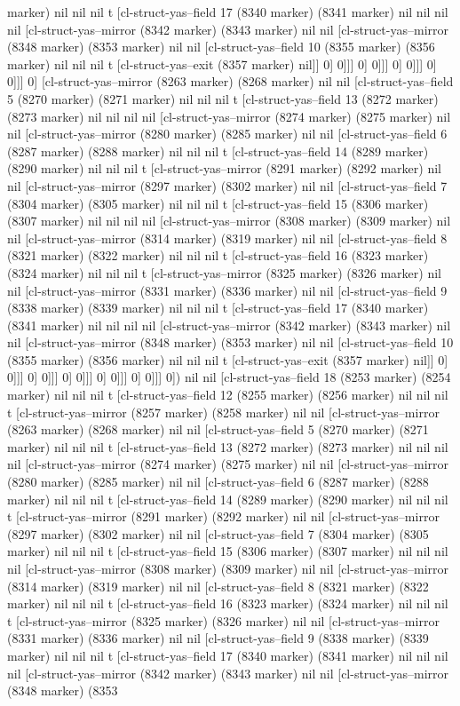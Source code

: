 {{marker) nil nil nil t [cl-struct-yas--field 17 (8340 marker) (8341 marker) nil nil nil nil [cl-struct-yas--mirror (8342 marker) (8343 marker) nil nil [cl-struct-yas--mirror (8348 marker) (8353 marker) nil nil [cl-struct-yas--field 10 (8355 marker) (8356 marker) nil nil nil t [cl-struct-yas--exit (8357 marker) nil]] 0] 0]]] 0] 0]]] 0] 0]]] 0] 0]]] 0] [cl-struct-yas--mirror (8263 marker) (8268 marker) nil nil [cl-struct-yas--field 5 (8270 marker) (8271 marker) nil nil nil t [cl-struct-yas--field 13 (8272 marker) (8273 marker) nil nil nil nil [cl-struct-yas--mirror (8274 marker) (8275 marker) nil nil [cl-struct-yas--mirror (8280 marker) (8285 marker) nil nil [cl-struct-yas--field 6 (8287 marker) (8288 marker) nil nil nil t [cl-struct-yas--field 14 (8289 marker) (8290 marker) nil nil nil t [cl-struct-yas--mirror (8291 marker) (8292 marker) nil nil [cl-struct-yas--mirror (8297 marker) (8302 marker) nil nil [cl-struct-yas--field 7 (8304 marker) (8305 marker) nil nil nil t [cl-struct-yas--field 15 (8306 marker) (8307 marker) nil nil nil nil [cl-struct-yas--mirror (8308 marker) (8309 marker) nil nil [cl-struct-yas--mirror (8314 marker) (8319 marker) nil nil [cl-struct-yas--field 8 (8321 marker) (8322 marker) nil nil nil t [cl-struct-yas--field 16 (8323 marker) (8324 marker) nil nil nil t [cl-struct-yas--mirror (8325 marker) (8326 marker) nil nil [cl-struct-yas--mirror (8331 marker) (8336 marker) nil nil [cl-struct-yas--field 9 (8338 marker) (8339 marker) nil nil nil t [cl-struct-yas--field 17 (8340 marker) (8341 marker) nil nil nil nil [cl-struct-yas--mirror (8342 marker) (8343 marker) nil nil [cl-struct-yas--mirror (8348 marker) (8353 marker) nil nil [cl-struct-yas--field 10 (8355 marker) (8356 marker) nil nil nil t [cl-struct-yas--exit (8357 marker) nil]] 0] 0]]] 0] 0]]] 0] 0]]] 0] 0]]] 0] 0]]] 0]) nil nil [cl-struct-yas--field 18 (8253 marker) (8254 marker) nil nil nil t [cl-struct-yas--field 12 (8255 marker) (8256 marker) nil nil nil t [cl-struct-yas--mirror (8257 marker) (8258 marker) nil nil [cl-struct-yas--mirror (8263 marker) (8268 marker) nil nil [cl-struct-yas--field 5 (8270 marker) (8271 marker) nil nil nil t [cl-struct-yas--field 13 (8272 marker) (8273 marker) nil nil nil nil [cl-struct-yas--mirror (8274 marker) (8275 marker) nil nil [cl-struct-yas--mirror (8280 marker) (8285 marker) nil nil [cl-struct-yas--field 6 (8287 marker) (8288 marker) nil nil nil t [cl-struct-yas--field 14 (8289 marker) (8290 marker) nil nil nil t [cl-struct-yas--mirror (8291 marker) (8292 marker) nil nil [cl-struct-yas--mirror (8297 marker) (8302 marker) nil nil [cl-struct-yas--field 7 (8304 marker) (8305 marker) nil nil nil t [cl-struct-yas--field 15 (8306 marker) (8307 marker) nil nil nil nil [cl-struct-yas--mirror (8308 marker) (8309 marker) nil nil [cl-struct-yas--mirror (8314 marker) (8319 marker) nil nil [cl-struct-yas--field 8 (8321 marker) (8322 marker) nil nil nil t [cl-struct-yas--field 16 (8323 marker) (8324 marker) nil nil nil t [cl-struct-yas--mirror (8325 marker) (8326 marker) nil nil [cl-struct-yas--mirror (8331 marker) (8336 marker) nil nil [cl-struct-yas--field 9 (8338 marker) (8339 marker) nil nil nil t [cl-struct-yas--field 17 (8340 marker) (8341 marker) nil nil nil nil [cl-struct-yas--mirror (8342 marker) (8343 marker) nil nil [cl-struct-yas--mirror (8348 marker) (8353 }}

